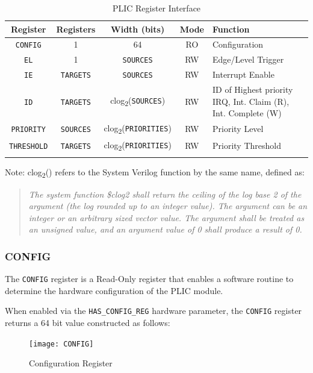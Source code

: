 \begin{longtable}[c]{@{\extracolsep{\fill}}ccccp{5cm}@{\extracolsep{\fill}}}	
	\toprule 
	\textbf{Register} & \textbf{Registers} & \textbf{Width (bits)} & \textbf{Mode} & \textbf{Function} \\
	\midrule 
	\endhead
	\texttt{CONFIG} & 1 & 64 & RO & Configuration\\
	\texttt{EL} & 1 & \texttt{SOURCES} & RW & Edge/Level Trigger\\
	\texttt{IE} & \texttt{TARGETS} & \texttt{SOURCES} & RW & Interrupt Enable\\
	\texttt{ID} & \texttt{TARGETS} & clog\textsubscript{2}(\texttt{SOURCES}) & RW & ID of Highest priority IRQ, \newline Int. Claim (R), \newline Int. Complete (W)\\
	\texttt{PRIORITY} & \texttt{SOURCES} & clog\textsubscript{2}(\texttt{PRIORITIES}) & RW & Priority Level\\
	\texttt{THRESHOLD} & \texttt{TARGETS} & clog\textsubscript{2}(\texttt{PRIORITIES}) & RW & Priority Threshold \\
	\bottomrule 	

\caption{PLIC Register Interface}
\label{tab:REGIF2}
\end{longtable}

Note: clog\textsubscript{2}() refers to the System Verilog function by
the same name, defined as:

\begin{quote}
\emph{The system function \$clog2 shall return the ceiling of the log
base 2 of the argument (the log rounded up to an integer value). The
argument can be an integer or an arbitrary sized vector value. The
argument shall be treated as an unsigned value, and an argument value of
0 shall produce a result of 0.}
\end{quote}

\subsubsection{CONFIG}

The \texttt{CONFIG} register is a Read-Only register that enables a
software routine to determine the hardware configuration of the PLIC
module.

When enabled via the \texttt{HAS\_CONFIG\_REG} hardware parameter, the
\texttt{CONFIG} register returns a 64 bit value constructed as follows:

\begin{figure}[h] 
	\texttt{[image: CONFIG]} 
	\caption[Configuration Register]{Configuration Register}
	\label{fig:configreg}
\end{figure}

